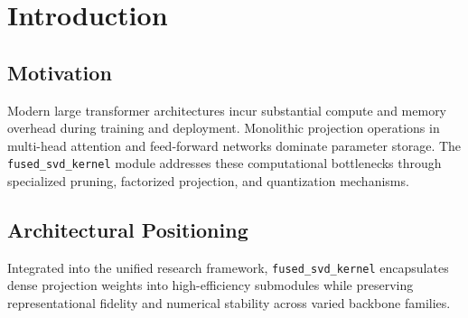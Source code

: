 \section{Introduction}

\subsection{Motivation}
Modern large transformer architectures incur substantial compute and memory overhead during training and deployment. Monolithic projection operations in multi-head attention and feed-forward networks dominate parameter storage. The \texttt{fused_svd_kernel} module addresses these computational bottlenecks through specialized pruning, factorized projection, and quantization mechanisms.

\subsection{Architectural Positioning}
Integrated into the unified research framework, \texttt{fused_svd_kernel} encapsulates dense projection weights into high-efficiency submodules while preserving representational fidelity and numerical stability across varied backbone families.
